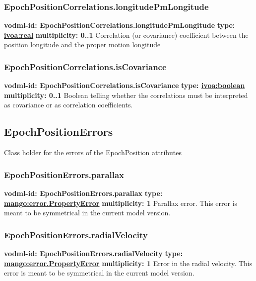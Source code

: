     \subsubsection{EpochPositionCorrelations.longitudePmLongitude}
    \textbf{vodml-id: EpochPositionCorrelations.longitudePmLongitude} \newline
    \textbf{type: \hyperref[sect:ivoa]{ivoa:real}} \newline
    \textbf{multiplicity: 0..1} \newline
    Correlation (or covariance) coefficient between the position longitude and the proper motion longitude

    \subsubsection{EpochPositionCorrelations.isCovariance}
    \textbf{vodml-id: EpochPositionCorrelations.isCovariance} \newline
    \textbf{type: \hyperref[sect:ivoa]{ivoa:boolean}} \newline
    \textbf{multiplicity: 0..1} \newline
    Boolean telling whether the correlations must be interpreted as covariance or as correlation coefficients.

  \subsection{EpochPositionErrors}
    \label{sect:EpochPositionErrors}
    Class holder for the errors of the EpochPosition attributes

    \subsubsection{EpochPositionErrors.parallax}
    \textbf{vodml-id: EpochPositionErrors.parallax} \newline
    \textbf{type: \hyperref[sect:error.PropertyError]{mango:error.PropertyError}} \newline
    \textbf{multiplicity: 1} \newline
    Parallax error. This error is meant to be symmetrical in the current model version.

    \subsubsection{EpochPositionErrors.radialVelocity}
    \textbf{vodml-id: EpochPositionErrors.radialVelocity} \newline
    \textbf{type: \hyperref[sect:error.PropertyError]{mango:error.PropertyError}} \newline
    \textbf{multiplicity: 1} \newline
    Error in the radial velocity. This error is meant to be symmetrical in the current model version.


